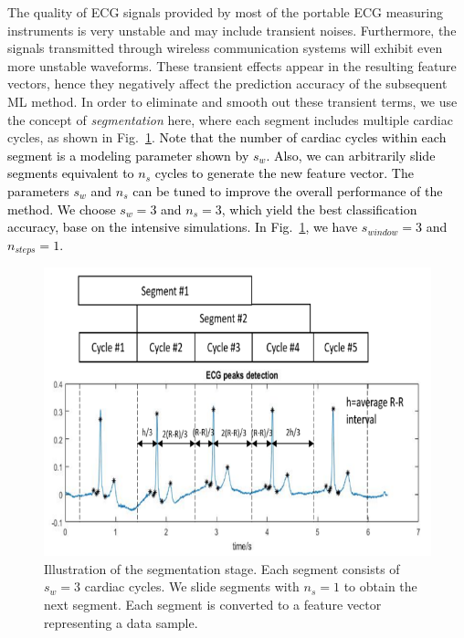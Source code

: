 The quality of ECG signals provided by most of the portable ECG measuring instruments is very unstable and may include transient noises. Furthermore, the signals transmitted through wireless communication systems will exhibit even more unstable waveforms. These transient effects appear in the resulting feature vectors, hence they negatively affect the prediction accuracy of the subsequent ML method. In order to eliminate and smooth out these transient terms, we use the concept of \textit{segmentation} here, where each segment includes multiple cardiac cycles, 
as shown in Fig.~\ref{fig:interval}. \textcolor{black}{Note that the number of cardiac cycles within each segment is a modeling parameter shown by $s_{w}$. Also, we can arbitrarily slide segments equivalent to $n_{s}$ cycles to generate the new feature vector. The parameters $s_{w}$ and $n_{s}$ can be tuned to improve the overall performance of the method. We choose $s_{w}=3$ and $n_{s}=3$, which yield the best classification accuracy, base on the intensive simulations. In Fig.~\ref{fig:interval}, we have $s_{window}=3$ and $n_{steps}=1$.}

\begin{figure}[t]
	\centering
	\includegraphics[scale=.8]{Fig/segment.png}
	\caption{Illustration of the segmentation stage. Each segment consists of $s_w=3$ cardiac cycles. We slide segments with $n_s=1$ to obtain the next segment. Each segment is converted to a feature vector representing a data sample.}
	\label{fig:interval}
\end{figure}


